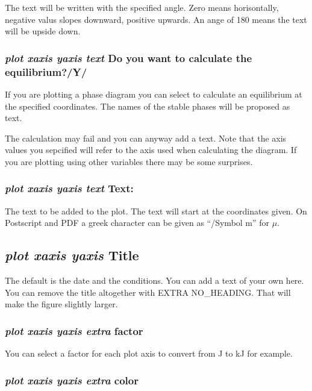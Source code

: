\documentclass[11pt]{article}
\begin{document}
The text will be written with the specified angle. Zero means
horisontally, negative valus slopes downward, positive upwards. An
ange of 180 means the text will be upside down.

\subsubsection{{\em plot xaxis yaxis text} Do you want to calculate the
equilibrium?/Y/}

If you are plotting a phase diagram you can select to calculate an
equilibrium at the specified coordinates.  The names of the stable
phases will be proposed as text.

The calculation may fail and you can anyway add a text.  Note that the
axis values you sepcified will refer to the axis used when calculating
the diagram.  If you are plotting using other variables there may be
some surprises.

\subsubsection{{\em plot xaxis yaxis text} Text: }

The text to be added to the plot.  The text will start at the
coordinates given.  On Postscript and PDF a greek character can be
given as ``{/Symbol m}'' for $\mu$.

\hypertarget{Plot title}{}
\subsection{{\em plot xaxis yaxis} Title}

The default is the date and the conditions.  You can add a text of
your own here.  You can remove the title altogether with EXTRA
NO\_HEADING.  That will make the figure slightly larger.

\hypertarget{Plot extra factor}{}
\subsubsection{{\em plot xaxis yaxis extra} factor}

You can select a factor for each plot axis to convert from J to kJ for
example.

\hypertarget{Plot color}{}
\subsubsection{{\em plot xaxis yaxis extra} color}
\end{document}
